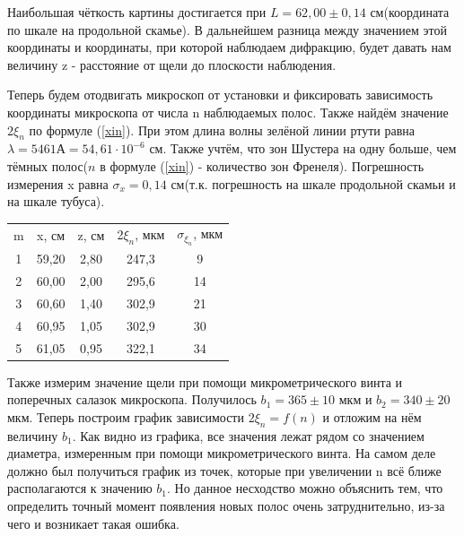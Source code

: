 \documentclass[a4paper,12pt]{article}
\begin{document}
Наибольшая чёткость картины достигается при $L = 62,00 \pm 0,14$ см(координата по шкале на продольной скамье). В дальнейшем разница между значением этой координаты и координаты, при которой наблюдаем дифракцию, будет давать нам величину z - расстояние от щели до плоскости наблюдения.

Теперь будем отодвигать микроскоп от установки и фиксировать зависимость координаты микроскопа от числа n наблюдаемых полос. Также найдём значение $2\xi_n$ по формуле (\ref{xin}). При этом длина волны зелёной линии ртути равна $\lambda = 5461 А = 54,61 \cdot 10^{-6}$ см. Также учтём, что зон Шустера на одну больше, чем тёмных полос($n$ в формуле (\ref{xin}) - количество зон Френеля). Погрешность измерения x равна $\sigma_x = 0,14$ см(т.к. погрешность на шкале продольной скамьи и на шкале тубуса).

\begin{table}[H]
    \centering
    \begin{tabular}{ccccc}
      m  & x, см  & z, см & 2$\xi_n$, мкм & $\sigma_{\xi_n}$, мкм\\
      1   & 59,20 & 2,80  & 247,3 & 9 \\
      2   & 60,00 & 2,00  & 295,6 & 14\\
      3   & 60,60 & 1,40  & 302,9 & 21\\
      4   & 60,95 & 1,05  & 302,9 & 30\\
      5   & 61,05 & 0,95  & 322,1 & 34\\
    \end{tabular}
    \label{tab:my_label}
\end{table}
Также измерим значение щели при помощи микрометрического винта и поперечных салазок микроскопа. Получилось $b_1 = 365 \pm 10$ мкм и $b_2 = 340 \pm 20$ мкм. Теперь построим график зависимости $2\xi_n = f(n)$ и отложим на нём величину $b_1$. Как видно из графика, все значения лежат рядом со значением диаметра, измеренным при помощи микрометрического винта. На самом деле должно был получиться график из точек, которые при увеличении n всё ближе располагаются к значению $b_1$. Но данное несходство можно объяснить тем, что определить точный момент появления новых полос очень затруднительно, из-за чего и возникает такая ошибка.
\end{document}
